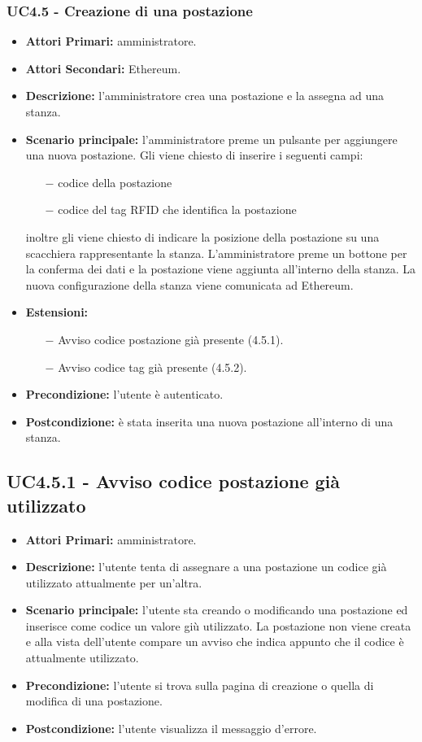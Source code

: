 \subsubsection{UC4.5 - Creazione di una postazione}
\begin{itemize}
	\item\textbf{Attori Primari:}
	amministratore.
	\item\textbf{Attori Secondari:}
	Ethereum.
	\item\textbf{Descrizione:}
	l'amministratore crea una postazione e la assegna ad una stanza.
	\item\textbf{Scenario principale:} 
	l'amministratore preme un pulsante per aggiungere una nuova postazione. Gli viene chiesto di inserire i seguenti campi:
	\begin{itemize}
		\item[$-$] codice della postazione
		\item[$-$] codice del tag RFID che identifica la postazione
	\end{itemize}
	inoltre gli viene chiesto di indicare la posizione della postazione su una scacchiera rappresentante la stanza.
	L'amministratore preme un bottone per la conferma dei dati e la postazione viene aggiunta all'interno della stanza. La nuova configurazione della stanza viene comunicata ad Ethereum.
	\item\textbf{Estensioni:}
	\begin{itemize}
		\item[$-$] Avviso codice postazione già presente (4.5.1).
		\item[$-$] Avviso codice tag già presente (4.5.2).
	\end{itemize}
	\item\textbf{Precondizione:} 
	l'utente è autenticato.
	\item\textbf{Postcondizione:}
	è stata inserita una nuova postazione all'interno di una stanza.
\end{itemize}



\subsection{UC4.5.1 - Avviso codice postazione già utilizzato}
\begin{itemize}
	\item\textbf{Attori Primari:}
	amministratore.
	\item\textbf{Descrizione:}
	l'utente tenta di assegnare a una postazione un codice già utilizzato attualmente per un'altra.
	\item\textbf{Scenario principale:}
	l'utente sta creando o modificando una postazione ed inserisce come codice un valore giù utilizzato.
	La postazione non viene creata e alla vista dell'utente compare un avviso che indica appunto che il codice è attualmente utilizzato.
	\item\textbf{Precondizione:}
	l'utente si trova sulla pagina di creazione o quella di modifica di una postazione.
	\item\textbf{Postcondizione:}
	l'utente visualizza il messaggio d'errore.
\end{itemize}

